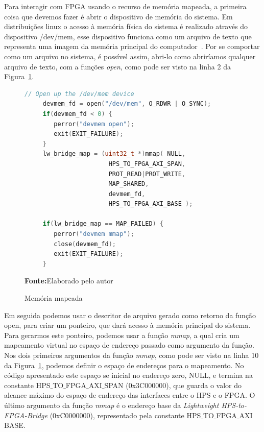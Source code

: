 Para interagir com FPGA usando o recurso de memória mapeada, a primeira coisa que devemos fazer é abrir o dispositivo de memória do sistema. Em distribuições linux o acesso à memória física do sistema é realizado através do dispositivo /dev/mem, esse dispositivo funciona como um arquivo de texto que representa uma imagem da memória principal do computador~\cite{manmem}. Por se comportar como um arquivo no sistema, é possível assim, abri-lo como abriríamos qualquer arquivo de texto, com a funções \textit{open}, como pode ser visto na linha 2 da Figura~\ref{fig:codigomap}.

\begin{figure}[ht]
	\caption{Memória mapeada}
	\begin{center}
	\begin{lstlisting}[language=C++, backgroundcolor=\color{gray!10}]
	 // Open up the /dev/mem device
	 devmem_fd = open("/dev/mem", O_RDWR | O_SYNC);
	 if(devmem_fd < 0) {
		perror("devmem open"); 
		exit(EXIT_FAILURE);
	 }	
	 lw_bridge_map = (uint32_t *)mmap( NULL, 
					   HPS_TO_FPGA_AXI_SPAN, 
					   PROT_READ|PROT_WRITE, 
					   MAP_SHARED, 
					   devmem_fd, 
					   HPS_TO_FPGA_AXI_BASE ); 
									
	 if(lw_bridge_map == MAP_FAILED) {
		perror("devmem mmap");
		close(devmem_fd);
		exit(EXIT_FAILURE);
	 }
	\end{lstlisting}
	{\small \textbf{Fonte:}Elaborado pelo autor}	
	\end{center}\label{fig:codigomap}
	\end{figure} 

	
Em seguida podemos usar o descritor de arquivo gerado como retorno da função open, para criar um ponteiro, que dará acesso à memória principal do sistema. Para gerarmos este ponteiro, podemos usar a função \textit{mmap}, a qual cria um mapeamento virtual no espaço de endereço passado como argumento da função. Nos dois primeiros argumentos da função \textit{mmap}, como pode ser visto na linha 10 da Figura~\ref{fig:codigomap},  podemos definir o espaço de endereços para o mapeamento. No código apresentado este espaço se inicial no endereço zero, NULL\@, e termina na constante HPS\underline{ }TO\underline{ }FPGA\underline{ }AXI\underline{ }SPAN (0x3C000000), que guarda o valor do alcance máximo do espaço de endereço das interfaces entre o HPS e o FPGA\@. O último argumento da função \textit{mmap} é o endereço base da \textit{Lightweight HPS-to-FPGA-Bridge} (0xC0000000), representado pela constante HPS\underline{ }TO\underline{ }FPGA\underline{ }AXI\underline{ }BASE\@.

